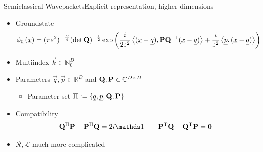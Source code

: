 \documentclass{beamer}
\begin{document}
\begin{frame}{Semiclassical Wavepackets}{Explicit representation, higher dimensions}
  \begin{itemize}
    \item Groundstate
    {\scriptsize
    \begin{align*}
      \phi_{\underline{0}}\left(\underline{x}\right)
      =
      (\pi\varepsilon^2)^{-\frac{D}{4}} (\det\mathbf{Q})^{-\frac{1}{2}}
      \exp \left( \frac{i}{2\varepsilon^2}
      \left\langle (\underline{x}-\underline{q}) , \mathbf{P}\mathbf{Q}{}^{-1}(\underline{x}-\underline{q}) \right\rangle
      + \frac{i}{\varepsilon^2} \left\langle \underline{p} , (\underline{x}-\underline{q}) \right\rangle
      \right)
    \end{align*}}
    \item Multiindex $\vec{k} \in \mathbb{N}_0^D$
    \item Parameters $\vec{q}, \vec{p} \in \mathbb{R}^D$ and $\mathbf{Q}, \mathbf{P} \in \mathbb{C}^{D \times D}$
    \begin{itemize}
      \item Parameter set $\Pi := \{\underline{q}, \underline{p}, \mathbf{Q}, \mathbf{P}\}$
    \end{itemize}
    \item Compatibility
    \begin{align*}
      \mat{Q}\H \mat{P} - \mat{P}\H \mat{Q} = 2i \id
      \qquad
      \mat{P}\T \mat{Q} - \mat{Q}\T \mat{P} = \mat{0}
    \end{align*}
    \item $\mathcal{R}, \mathcal{L}$ much more complicated
  \end{itemize}
\end{frame}
\end{document}
